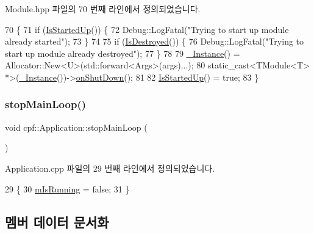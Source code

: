 Module.\+hpp 파일의 70 번째 라인에서 정의되었습니다.


\begin{DoxyCode}
70                                             \{
71             \textcolor{keywordflow}{if} (\hyperlink{classcpf_1_1_t_module_a73732afee7131dad652bf3e00c75cef9}{IsStartedUp}()) \{
72                 Debug::LogFatal(\textcolor{stringliteral}{"Trying to start up module already started"});
73             \}
74 
75             \textcolor{keywordflow}{if} (\hyperlink{classcpf_1_1_t_module_a9f70f0a70ac59b13b7a874f82c877337}{IsDestroyed}()) \{
76                 Debug::LogFatal(\textcolor{stringliteral}{"Trying to start up module already destroyed"});
77             \}
78 
79             \hyperlink{classcpf_1_1_t_module_a06ab8af8ea6b294959937fd2bbc1e615}{\_Instance}() = Allocator::New<U>(std::forward<Args>(args)...);
80             \textcolor{keyword}{static\_cast<}TModule<T> *\textcolor{keyword}{>}(\hyperlink{classcpf_1_1_t_module_a06ab8af8ea6b294959937fd2bbc1e615}{\_Instance}())->\hyperlink{classcpf_1_1_t_module_a15c93b1aca54022e145961bea8e3ea7d}{onShutDown}();
81 
82             \hyperlink{classcpf_1_1_t_module_a73732afee7131dad652bf3e00c75cef9}{IsStartedUp}() = \textcolor{keyword}{true};
83         \}
\end{DoxyCode}
\mbox{\label{classcpf_1_1_application_a527bcad0b3cf7a33ccc8de9318c6d984}} 
\subsubsection{\texorpdfstring{stop\+Main\+Loop()}{stopMainLoop()}}
{\footnotesize\ttfamily void cpf\+::\+Application\+::stop\+Main\+Loop (\begin{DoxyParamCaption}{ }\end{DoxyParamCaption})}



Application.\+cpp 파일의 29 번째 라인에서 정의되었습니다.


\begin{DoxyCode}
29                                    \{
30         \hyperlink{classcpf_1_1_application_a84a6e2bafcc39719acee9885a064ac75}{mIsRunning} = \textcolor{keyword}{false};
31     \}
\end{DoxyCode}


\subsection{멤버 데이터 문서화}
\mbox{\label{classcpf_1_1_application_aeef620fe71f2ac891e3650d6d3462b28}} 
